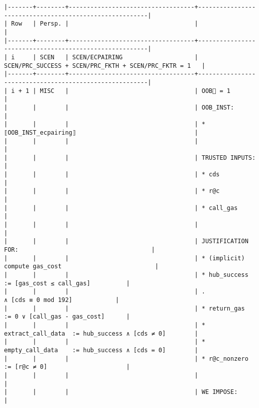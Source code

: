 \documentclass[varwidth=\maxdimen,margin=0.5cm,multi={verbatim}]{standalone}
\begin{document}
\begin{verbatim}
|-------+--------+-----------------------------------+--------------------------------------------------------|
| Row   | Persp. |                                   |                                                        |
|-------+--------+-----------------------------------+--------------------------------------------------------|
| i     | SCEN   | SCEN/ECPAIRING                    | SCEN/PRC_SUCCESS + SCEN/PRC_FKTH + SCEN/PRC_FKTR = 1   |
|-------+--------+-----------------------------------+--------------------------------------------------------|
| i + 1 | MISC   |                                   | OOB🚩 = 1                                              |
|       |        |                                   | OOB_INST:                                              |
|       |        |                                   | * ⟦OOB_INST_ecpairing⟧                                 |
|       |        |                                   |                                                        |
|       |        |                                   | TRUSTED INPUTS:                                        |
|       |        |                                   | * cds                                                  |
|       |        |                                   | * r@c                                                  |
|       |        |                                   | * call_gas                                             |
|       |        |                                   |                                                        |
|       |        |                                   | JUSTIFICATION FOR:                                     |
|       |        |                                   | * (implicit) compute gas_cost                          |
|       |        |                                   | * hub_success        := [gas_cost ≤ call_gas]          |
|       |        |                                   | .                       ∧ [cds ≡ 0 mod 192]            |
|       |        |                                   | * return_gas         := 0 ∨ [call_gas - gas_cost]      |
|       |        |                                   | * extract_call_data  := hub_success ∧ [cds ≠ 0]        |
|       |        |                                   | * empty_call_data    := hub_success ∧ [cds = 0]        |
|       |        |                                   | * r@c_nonzero        := [r@c ≠ 0]                      |
|       |        |                                   |                                                        |
|       |        |                                   | WE IMPOSE:                                             |

\end{verbatim}
\end{document}

